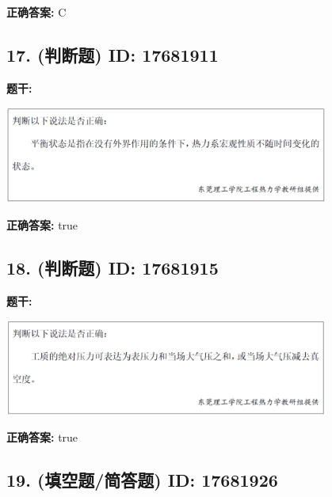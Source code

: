 \documentclass[12pt]{article}
\begin{document}
\textbf{正确答案:}
C

\vspace{0.5em}\hrulefill\vspace{1em}

\subsection*{17. (判断题) \small ID: 17681911}

\textbf{题干:}


\begin{center}\includegraphics[width=0.8\textwidth, height=0.25\textheight, keepaspectratio]{question_17_17681911/title_img_1.png}\end{center}

\textbf{正确答案:}
true

\vspace{0.5em}\hrulefill\vspace{1em}

\subsection*{18. (判断题) \small ID: 17681915}

\textbf{题干:}


\begin{center}\includegraphics[width=0.8\textwidth, height=0.25\textheight, keepaspectratio]{question_18_17681915/title_img_1.png}\end{center}

\textbf{正确答案:}
true

\vspace{0.5em}\hrulefill\vspace{1em}

\subsection*{19. (填空题/简答题) \small ID: 17681926}
\end{document}
